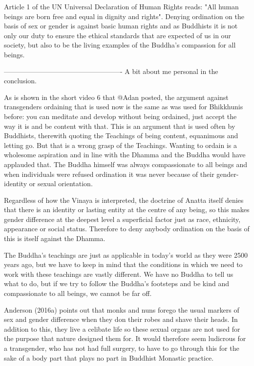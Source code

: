 Article 1 of the UN Universal Declaration of Human Rights reads: "All human beings are born free and equal in dignity and rights". Denying ordination on the basis of sex or gender is against basic human rights and as Buddhists it is not only our duty to ensure the ethical standards that are expected of us in our society, but also to be the living examples of the Buddha's compassion for all beings.


----------------------------------------------------
A bit about me personal in the conclusion.



As is shown in the short video 6 that @Adan posted, the argument against transgenders ordaining that is used now is the same as was used for Bhikkhunis before: you can meditate and develop without being ordained, just accept the way it is and be content with that. This is an argument that is used often by Buddhists, therewith quoting the Teachings of being content, equanimous and letting go. But that is a wrong grasp of the Teachings. Wanting to ordain is a wholesome aspiration and in line with the Dhamma and the Buddha would have applauded that. The Buddha himself was always compassionate to all beings and when individuals were refused ordination it was never because of their gender-identity or sexual orientation.



Regardless of how the Vinaya is interpreted, the doctrine of Anatta itself denies that there is an identity or lasting entity at the centre of any being, so this makes gender difference at the deepest level a superficial factor just as race, ethnicity, appearance or social status. Therefore to deny anybody ordination on the basis of this is itself against the Dhamma.

The Buddha’s teachings are just as applicable in today’s world as they were 2500 years ago, but we have to keep in mind that the conditions in which we need to work with these teachings are vastly different. We have no Buddha to tell us what to do, but if we try to follow the Buddha’s footsteps and be kind and compassionate to all beings, we cannot be far off.


Anderson (2016a) points out that monks and nuns forego the usual markers of sex and gender difference when they don their robes and shave their heads. In addition to this, they live a celibate life so these sexual organs are not used for the purpose that nature designed them for. It would therefore seem ludicrous for a transgender, who has not had full surgery, to have to go through this for the sake of a body part that plays no part in Buddhist Monastic practice.

